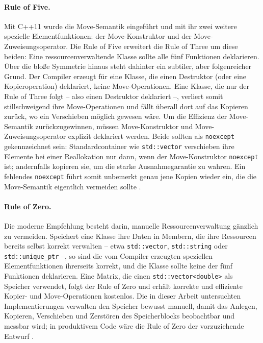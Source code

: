 \documentclass[10pt,a4paper]{article}
\begin{document}
\paragraph{Rule of Five.}
Mit C++11 wurde die Move-Semantik eingeführt und mit ihr zwei weitere
spezielle Elementfunktionen: der Move-Konstruktor und der
Move-Zuweisungsoperator. Die Rule of Five erweitert die Rule of Three um
diese beiden: Eine ressourcenverwaltende Klasse sollte alle fünf
Funktionen deklarieren. Über die bloße Symmetrie hinaus steht dahinter
ein subtiler, aber folgenreicher Grund. Der Compiler erzeugt für eine
Klasse, die einen Destruktor (oder eine Kopieroperation) deklariert,
keine Move-Operationen. Eine Klasse, die nur der Rule of Three folgt --
also einen Destruktor deklariert --, verliert somit stillschweigend ihre
Move-Operationen und fällt überall dort auf das Kopieren zurück, wo
ein Verschieben möglich gewesen wäre. Um die Effizienz der
Move-Semantik zurückzugewinnen, müssen Move-Konstruktor und
Move-Zuweisungsoperator explizit deklariert werden. Beide sollten als
\texttt{noexcept} gekennzeichnet sein: Standardcontainer wie
\texttt{std::vector} verschieben ihre Elemente bei einer Reallokation nur
dann, wenn der Move-Konstruktor \texttt{noexcept} ist; andernfalls
kopieren sie, um die starke Ausnahmegarantie zu wahren. Ein fehlendes
\texttt{noexcept} führt somit unbemerkt genau jene Kopien wieder ein,
die die Move-Semantik eigentlich vermeiden sollte \cite{meyers2014,coreguidelines}.

\paragraph{Rule of Zero.}
Die moderne Empfehlung besteht darin, manuelle Ressourcenverwaltung
gänzlich zu vermeiden. Speichert eine Klasse ihre Daten in Membern, die
ihre Ressourcen bereits selbst korrekt verwalten -- etwa
\texttt{std::vector}, \texttt{std::string} oder \texttt{std::unique\_ptr}
--, so sind die vom Compiler erzeugten speziellen Elementfunktionen
ihrerseits korrekt, und die Klasse sollte keine der fünf Funktionen
deklarieren. Eine Matrix, die einen \texttt{std::vector<double>} als
Speicher verwendet, folgt der Rule of Zero und erhält korrekte und
effiziente Kopier- und Move-Operationen kostenlos. Die in dieser Arbeit
untersuchten Implementierungen verwalten den Speicher bewusst manuell,
damit das Anlegen, Kopieren, Verschieben und Zerstören des
Speicherblocks beobachtbar und messbar wird; in produktivem Code wäre
die Rule of Zero der vorzuziehende Entwurf \cite{coreguidelines,meyers2014}.
\end{document}
